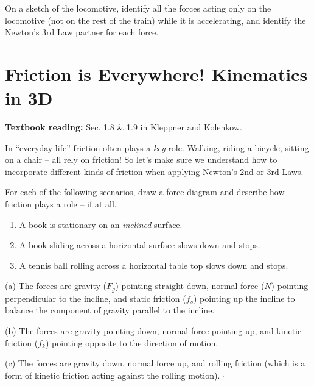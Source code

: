 \documentclass[11pt, letterpaper, openany]{book}
\newenvironment{exercise}[1][Exercise]{%
  \tcolorbox[blanker, breakable, left=1em,
    before skip=1em, after skip=1em,
    borderline west={3pt}{0pt}{PhysNavy},
    colback=PhysCream,
    before upper={\textcolor{PhysNavy}{\sffamily\bfseries #1:}\space}
  ]%
}{%
  \endtcolorbox%
}
\newenvironment{solution}[1][Solution]{%
  \tcolorbox[blanker, breakable, left=1em,
    before skip=1em, after skip=1em,
    borderline west={2pt}{0pt}{PhysTeal},
    colback=PhysCream,
    before upper={\textcolor{PhysTeal}{\sffamily\bfseries #1.}\space}
  ]%
}{%
  \hfill\textcolor{PhysTeal}{\ensuremath{\square}}\endtcolorbox%
}
\begin{document}
\begin{exercise}[Exercise 9]
On a sketch of the locomotive, identify all the forces acting only on the locomotive (not on the rest of the train) while it is accelerating, and identify the Newton's 3rd Law partner for each force.
\end{exercise}

\chapter{Friction is Everywhere! Kinematics in 3D}

\textbf{Textbook reading:} Sec. 1.8 \& 1.9 in Kleppner and Kolenkow.

In ``everyday life'' friction often plays a \textit{key} role. Walking, riding a bicycle, sitting on a chair -- all rely on friction! So let's make sure we understand how to incorporate different kinds of friction when applying Newton's 2nd or 3rd Laws.

\begin{exercise}[Exercise 1]
For each of the following scenarios, draw a force diagram and describe how friction plays a role -- if at all.
\begin{enumerate}[label=(\alph*)]
    \item A book is stationary on an \textit{inclined} surface.
    \item A book sliding across a horizontal surface slows down and stops.
    \item A tennis ball rolling across a horizontal table top slows down and stops.
\end{enumerate}
\end{exercise}
\begin{solution}
(a) The forces are gravity ($F_g$) pointing straight down, normal force ($N$) pointing perpendicular to the incline, and static friction ($f_s$) pointing up the incline to balance the component of gravity parallel to the incline.

(b) The forces are gravity pointing down, normal force pointing up, and kinetic friction ($f_k$) pointing opposite to the direction of motion.

(c) The forces are gravity down, normal force up, and rolling friction (which is a form of kinetic friction acting against the rolling motion).
\end{solution}
\end{document}
